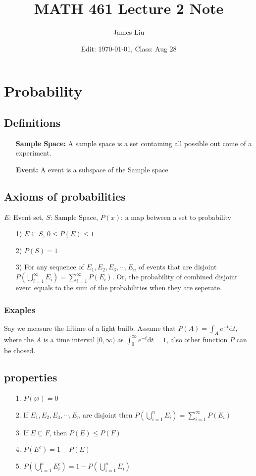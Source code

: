 \documentclass{article}
\date{Edit: \today, Class: Aug 28}
\title{MATH 461 Lecture 2 Note}
\author{James Liu}
\begin{document}
\maketitle
\section{Probability}
\subsection{Definitions}
\begin{itemize}
    \item [\textbf{Sample Space:}] A sample space is a set containing all possible out come of a experiment.
    \item [\textbf{Event:}] A event is a subspace of the Sample space
\end{itemize}
\subsection{Axioms of probabilities}
\(E\): Event set, \(S\): Sample Space, \(P(x)\): a map between a set to probability 
\begin{itemize}
    \item [1)]\(E\subseteq S\), \(0\leqslant P(E)\leqslant1\)
    \item [2)]\(P(S)=1\)
    \item [3)] For any sequence of \(E_1,E_2,E_3,\cdots,E_n\) of events that are disjoint
        \\ \(P(\bigcup _{i=1}^\infty E_i)=\sum_{i=1}^\infty P(E_i)\). Or, the probability of combined disjoint event equals to the sum of the probabilities when they are seperate.
\end{itemize}
\subsubsection*{Exaples}
Say we measure the liftime of a light builb. Assume that \(P(A) = \int_A e^{-t} \text{d}t\),
where the \(A\) is a time interval \([0,\infty)\) as \(\int_{0}^{\infty}e^{-t}\text{d}t=1\), also other 
function \(P\) can be chosed.
\subsection{properties}
\begin{itemize}
    \item [1.] \(P(\varnothing )=0\)
    \item [2.] If \(E_1,E_2,E_3,\cdots,E_n\) are disjoint then \(P(\bigcup _{i=1}^n E_i)=\sum_{i=1}^\infty P(E_i)\)
    \item [3.] If \(E\subseteq F\), then \(P(E)\leqslant P(F)\)
    \item [4.] \(P(E^c)=1-P(E)\)
    \item [5.] \(P(\bigcup _{i=1}^n E^c_i)=1-P(\bigcup _{i=1}^n E_i)\)
\end{itemize}
\end{document}
